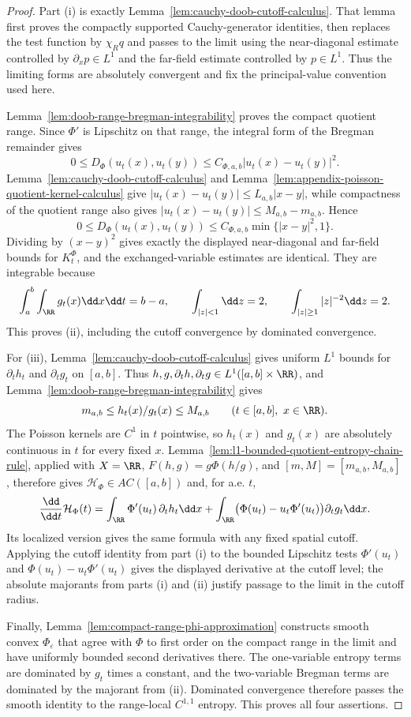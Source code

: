 \begin{proof}
Part (i) is exactly Lemma~\ref{lem:cauchy-doob-cutoff-calculus}.  That lemma
first proves the compactly supported Cauchy-generator identities, then replaces
the test function by $\chi_Rq$ and passes to the limit using the near-diagonal
estimate controlled by $\partial_xp\in L^1$ and the far-field estimate
controlled by $p\in L^1$.  Thus the limiting forms are absolutely convergent
and fix the principal-value convention used here.

Lemma~\ref{lem:doob-range-bregman-integrability} proves the compact quotient
range.  Since \(\Phi'\) is Lipschitz on that range, the integral form of the
Bregman remainder gives
\[
0\le D_\Phi(u_t(x),u_t(y))
\le C_{\Phi,a,b}|u_t(x)-u_t(y)|^2.
\]
Lemma~\ref{lem:cauchy-doob-cutoff-calculus} and
Lemma~\ref{lem:appendix-poisson-quotient-kernel-calculus} give
\(|u_t(x)-u_t(y)|\le L_{a,b}|x-y|\), while compactness of the quotient range
also gives \(|u_t(x)-u_t(y)|\le M_{a,b}-m_{a,b}\).  Hence
\[
0\le D_\Phi(u_t(x),u_t(y))
\le C_{\Phi,a,b}\min\{|x-y|^2,1\}.
\]
Dividing by \((x-y)^2\) gives exactly the displayed near-diagonal and
far-field bounds for \(K_t^\Phi\), and the exchanged-variable estimates are
identical.  They are integrable because
\[
\int_a^b\int_{\RR}g_t(x)\dd x\dd t=b-a,\qquad
\int_{|z|<1}\dd z=2,\qquad
\int_{|z|\ge1}|z|^{-2}\dd z=2 .
\]
This proves (ii), including the cutoff convergence by dominated convergence.

For (iii), Lemma~\ref{lem:cauchy-doob-cutoff-calculus} gives uniform
$L^1$ bounds for $\partial_th_t$ and $\partial_tg_t$ on $[a,b]$.  Thus
$h,g,\partial_th,\partial_tg\in L^1([a,b]\times\RR)$, and
Lemma~\ref{lem:doob-range-bregman-integrability} gives
\[
m_{a,b}\le h_t(x)/g_t(x)\le M_{a,b}
\qquad(t\in[a,b],\ x\in\RR).
\]
The Poisson kernels are \(C^1\) in \(t\) pointwise, so \(h_t(x)\) and
\(g_t(x)\) are absolutely continuous in \(t\) for every fixed \(x\).
Lemma~\ref{lem:l1-bounded-quotient-entropy-chain-rule}, applied with
\(X=\RR\), \(F(h,g)=g\Phi(h/g)\), and
\([m,M]=[m_{a,b},M_{a,b}]\), therefore gives
\(\mathcal H_\Phi\in AC([a,b])\) and, for a.e. \(t\),
\[
\frac{\dd}{\dd t}\mathcal H_\Phi(t)
=
\int_{\RR}\Phi'(u_t)\,\partial_th_t\dd x
+
\int_{\RR}\bigl(\Phi(u_t)-u_t\Phi'(u_t)\bigr)\partial_tg_t\dd x .
\]
Its localized version gives the same formula with any fixed spatial cutoff.
Applying the cutoff identity from part (i) to the bounded Lipschitz tests
\(\Phi'(u_t)\) and \(\Phi(u_t)-u_t\Phi'(u_t)\) gives the displayed derivative
at the cutoff level; the absolute majorants from parts (i) and (ii) justify
passage to the limit in the cutoff radius.

Finally, Lemma~\ref{lem:compact-range-phi-approximation} constructs smooth
convex $\Phi_\varepsilon$ that agree with $\Phi$ to first order on the compact
range in the limit and have uniformly bounded second derivatives there.  The
one-variable entropy terms are dominated by $g_t$ times a constant, and the
two-variable Bregman terms are dominated by the majorant from (ii).  Dominated
convergence therefore passes the smooth identity to the range-local
$C^{1,1}$ entropy.  This proves all four assertions.
\end{proof}

